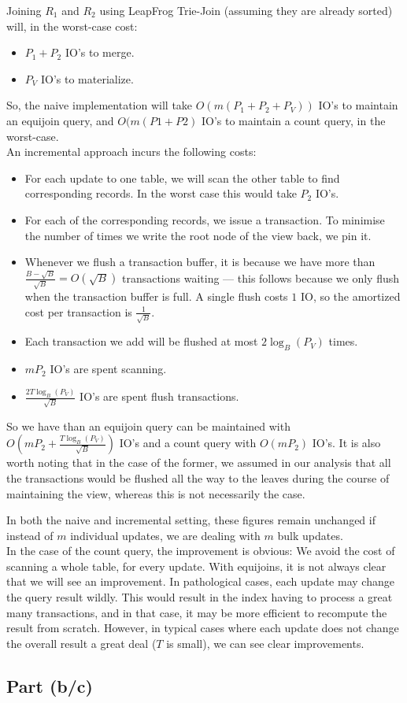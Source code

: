 Joining $R_1$ and $R_2$ using LeapFrog Trie-Join (assuming they are already sorted) will, in the worst-case cost:
\begin{itemize}
  \item $P_1 + P_2$ IO's to merge.
  \item $P_V$ IO's to materialize.
\end{itemize}
So, the na\:ive implementation will take $O(m(P_1 + P_2 + P_V))$ IO's to maintain an equijoin query, and $O(m(P1 + P2)$ IO's to maintain a count query, in the worst-case.\\[1em]

An incremental approach incurs the following costs:
\begin{itemize}
  \item For each update to one table, we will scan the other table to find corresponding records. In the worst case this would take $P_2$ IO's.
  \item For each of the corresponding records, we issue a transaction. To minimise the number of times we write the root node of the view back, we pin it.
  \item Whenever we flush a transaction buffer, it is because we have more than $\frac{B - \sqrt{B}}{\sqrt{B}}=O(\sqrt{B})$ transactions waiting --- this follows because we only flush when the transaction buffer is full. A single flush costs $1$ IO, so the amortized cost per transaction is $\frac{1}{\sqrt{B}}$.
  \item Each transaction we add will be flushed at most $2\log_B(P_V)$ times.
  \item $mP_2$ IO's are spent scanning.
  \item $\frac{2T\log_B(P_V)}{\sqrt{B}}$ IO's are spent flush transactions.
\end{itemize}

So we have than an equijoin query can be maintained with ${O(mP_2 + \frac{T\log_B(P_V)}{\sqrt{B}})}$ IO's and a count query with $O(mP_2)$ IO's. It is also worth noting that in the case of the former, we assumed in our analysis that all the transactions would be flushed all the way to the leaves during the course of maintaining the view, whereas this is not necessarily the case.

In both the na\:ive and incremental setting, these figures remain unchanged if instead of $m$ individual updates, we are dealing with $m$ bulk updates.\\[1em]

In the case of the count query, the improvement is obvious: We avoid the cost of scanning a whole table, for every update. With equijoins, it is not always clear that we will see an improvement. In pathological cases, each update may change the query result wildly. This would result in the index having to process a great many transactions, and in that case, it may be more efficient to recompute the result from scratch. However, in typical cases where each update does not change the overall result a great deal ($T$ is small), we can see clear improvements.

\subsection{Part (b/c)}\label{sec:q-1-b}
